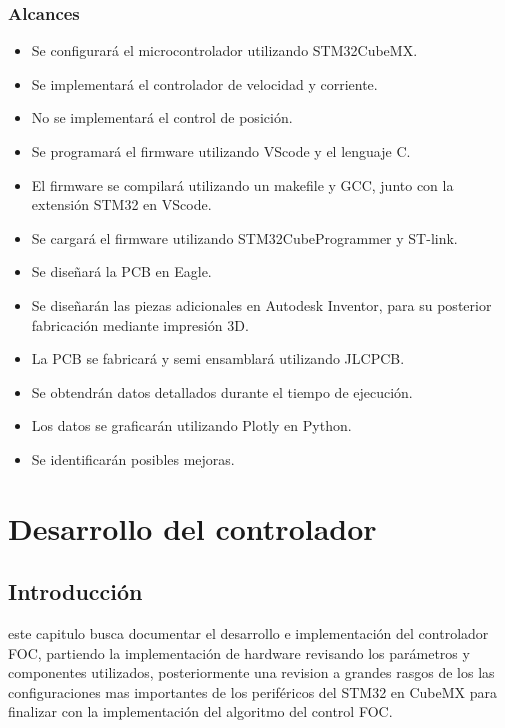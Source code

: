 \documentclass[11pt]{report}
\begin{document}
\subsection{Alcances}
\begin{itemize}
	\item Se configurará el microcontrolador utilizando STM32CubeMX.
	\item Se implementará el controlador de velocidad y corriente.
	\item No se implementará el control de posición.
	\item Se programará el firmware utilizando VScode y el lenguaje C.
	\item El firmware se compilará utilizando un makefile y GCC, junto con la extensión STM32 en VScode.
	\item Se cargará el firmware utilizando STM32CubeProgrammer y ST-link.
	\item Se diseñará la PCB en Eagle.
	\item Se diseñarán las piezas adicionales en Autodesk Inventor, para su posterior fabricación mediante impresión 3D.
	\item La PCB se fabricará y semi ensamblará utilizando JLCPCB.
	\item Se obtendrán datos detallados durante el tiempo de ejecución.
	\item Los datos se graficarán utilizando Plotly en Python.
	\item Se identificarán posibles mejoras.
\end{itemize}


\chapter{Desarrollo del controlador}
\section{Introducción}
este capitulo busca documentar el desarrollo e implementación del controlador FOC, partiendo la implementación de hardware revisando los parámetros y componentes utilizados, posteriormente una revision a grandes rasgos de los las configuraciones mas importantes de los periféricos del STM32 en CubeMX para finalizar con la implementación del algoritmo del control FOC.
\end{document}
